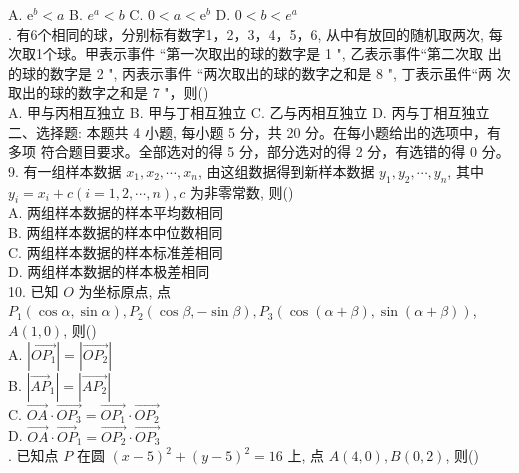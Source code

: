 \documentclass[UTF8]{ctexart}
\begin{document}
	A. $\mathrm{e}^{b}<a$\qquad
	B. $e^{a}<b$\qquad
	C. $0<a<\mathrm{e}^{b}$\qquad
	D. $0<b<e^{a}$\\
		. 有6个相同的球，分别标有数字1，2，3，4，5，6, 从中有放回的随机取两次,
	每次取1个球。甲表示事件 “第一次取出的球的数字是 1 ", 乙表示事件“第二次取
	出的球的数字是 2 ", 丙表示事件 “两次取出的球的数字之和是 8 ", 丁表示虽件“两
	次取出的球的数字之和是 7 "，则(\qquad)\\
	
 \noindent	A. 甲与丙相互独立\qquad
	B. 甲与丁相互独立\qquad
	C. 乙与丙相互独立\qquad
	D. 丙与丁相互独立\\
	
	二、选择题: 本题共 4 小题, 每小题 5 分，共 20 分。在每小题给出的选项中，有多项
	符合题目要求。全部选对的得 5 分，部分选对的得 2 分，有选错的得 0 分。\\
	
	9. 有一组样本数据 $x_{1}, x_{2}, \cdots, x_{n}$, 由这组数据得到新样本数据 $y_{1}, y_{2}, \cdots, y_{n}$, 其中
	$y_{i}=x_{i}+c(i=1,2, \cdots, n), c$ 为非零常数, 则(\qquad)\\
	
	A. 两组样本数据的样本平均数相同\\

	B. 两组样本数据的样本中位数相同\\
	
	C. 两组样本数据的样本标准差相同\\
	
	D. 两组样本数据的样本极差相同\\
	
	10. 已知 $O$ 为坐标原点, 点 $P_{1}(\cos \alpha, \sin \alpha), P_{2}(\cos \beta,-\sin \beta), P_{3}(\cos (\alpha+\beta), \sin (\alpha+\beta))$,
	$A(1,0)$, 则(\qquad)\\
	
	A. $\left|\overrightarrow{O P_{1}}\right|=\left|\overrightarrow{O P_{2}}\right|$\\
	
	B. $\left|\overrightarrow{A P}_{1}\right|=\left|\overrightarrow{A P_{2}}\right|$\\
	
	C. $\overrightarrow{O A} \cdot \overrightarrow{O P_{3}}=\overrightarrow{O P_{1}} \cdot \overrightarrow{O P_{2}}$\\
	
	D. $\overrightarrow{O A} \cdot \overrightarrow{O P}_{1}=\overrightarrow{O P_{2}} \cdot \overrightarrow{O P_{3}}$\\
			. 已知点 $P$ 在圆 $(x-5)^{2}+(y-5)^{2}=16$ 上, 点 $A(4,0), B(0,2)$, 则(\qquad)\\
	
\end{document}
